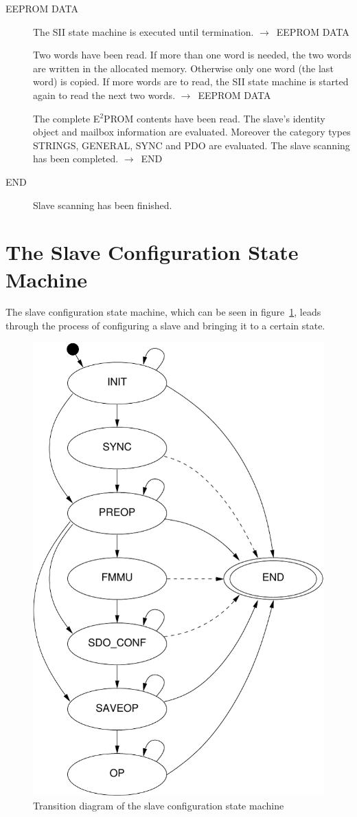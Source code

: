 \documentclass[a4paper,12pt,BCOR6mm,bibtotoc,idxtotoc]{scrbook}
\begin{document}
\begin{description}
\item[EEPROM DATA] The SII state machine is executed until
  termination. $\rightarrow$~EEPROM DATA

  Two words have been read. If more than one word is needed, the two
  words are written in the allocated memory. Otherwise only one word
  (the last word) is copied. If more words are to read, the SII state
  machine is started again to read the next two words.
  $\rightarrow$~EEPROM DATA

  The complete E$^2$PROM contents have been read. The slave's identity
  object and mailbox information are evaluated. Moreover the category
  types STRINGS, GENERAL, SYNC and PDO are evaluated. The slave
  scanning has been completed. $\rightarrow$~END

\item[END] Slave scanning has been finished.

\end{description}


\section{The Slave Configuration State Machine}
\label{sec:fsm-conf}

The slave configuration state machine, which can be seen in
figure~\ref{fig:fsm-slaveconf}, leads through the process of
configuring a slave and bringing it to a certain state.

\begin{figure}[htbp]
  \centering
  \includegraphics[width=.6\textwidth]{images/fsm-slaveconf}
  \caption{Transition diagram of the slave configuration state
    machine}
  \label{fig:fsm-slaveconf}
\end{figure}
\end{document}
